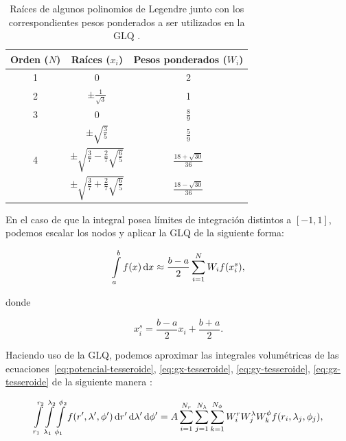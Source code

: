 \begin{table}
    \centering
    \caption{
        Raíces de algunos polinomios de Legendre junto con los correspondientes
        pesos ponderados a ser utilizados en la \ac{GLQ}
        \citep[][p.~392]{hildebrand1987}.
    }
    \begin{tabular}{ccc}
        \hline
        Orden ($N$) & Raíces ($x_i$)                                     & Pesos ponderados ($W_i$)    \\
        \hline
        1     & 0                                                        & 2                           \\
        2     & $\pm \frac{1}{\sqrt{3}}$                                 & 1                           \\
        3     & 0                                                        & $\frac{8}{9}$               \\
              & $\pm \sqrt{\frac{3}{5}}$                                 & $\frac{5}{9}$               \\
        4     & $\pm \sqrt{\frac{3}{7} - \frac{2}{7}\sqrt{\frac{6}{5}}}$ & $\frac{18 + \sqrt{30}}{36}$ \\
              & $\pm \sqrt{\frac{3}{7} + \frac{2}{7}\sqrt{\frac{6}{5}}}$ & $\frac{18 - \sqrt{30}}{36}$
    \end{tabular}
    \label{tab:legendre-roots}
\end{table}

En el caso de que la integral posea límites de integración distintos a
$[-1, 1]$, podemos escalar los nodos y aplicar la \ac{GLQ} de la siguiente
forma:

\begin{equation}
    \int\limits_a^b f(x) \mathop{}\!\textnormal{d} x \approx
        \frac{b - a}{2} \sum\limits_{i=1}^{N}
        W_i f(x_i^s),
\end{equation}

\noindent donde

\begin{equation}
    x_i^s = \frac{b - a}{2} x_i + \frac{b + a}{2}.
\end{equation}

Haciendo uso de la \ac{GLQ}, podemos aproximar las integrales volumétricas de
las ecuaciones~\ref{eq:potencial-tesseroide}, \ref{eq:gx-tesseroide},
\ref{eq:gy-tesseroide}, \ref{eq:gz-tesseroide} de la siguiente manera
\citep{asgharzadeh2007,uieda2016}:

\begin{equation}
    \int\limits_{r_1}^{r_2}
    \int\limits_{\lambda_1}^{\lambda_2}
    \int\limits_{\phi_1}^{\phi_2}
    f(r', \lambda', \phi')
    \mathop{}\!\textnormal{d} r' \mathop{}\!\textnormal{d} \lambda' \mathop{}\!\textnormal{d} \phi' =
    A
    \sum\limits_{i=1}^{N_r}
    \sum\limits_{j=1}^{N_\lambda}
    \sum\limits_{k=1}^{N_\phi}
    W_i^r
    W_j^\lambda
    W_k^\phi
    f(r_i, \lambda_j, \phi_j),
    \label{eq:glq-integral-volumetrica}
\end{equation}

